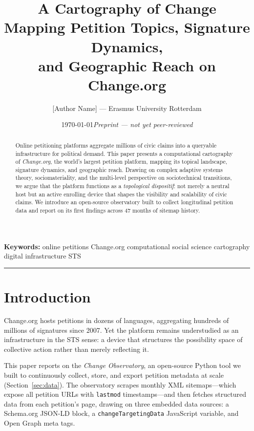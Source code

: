 \documentclass[a4paper, justified, notoc, nobib]{tufte-handout}
\title{A Cartography of Change\\[0.3em]
       \large Mapping Petition Topics, Signature Dynamics,\\
       and Geographic Reach on Change.org}
\author{[Author Name] --- Erasmus University Rotterdam}
\date{\today\quad\textit{Preprint --- not yet peer-reviewed}}
\begin{document}
\maketitle

\begin{abstract}
\noindent
Online petitioning platforms aggregate millions of civic claims into a
queryable infrastructure for political demand.
This paper presents a computational cartography of \emph{Change.org}, the
world's largest petition platform, mapping its topical landscape, signature
dynamics, and geographic reach.
Drawing on complex adaptive systems theory, sociomateriality, and the
multi-level perspective on sociotechnical transitions, we argue that the
platform functions as a \emph{topological dispositif}: not merely a neutral
host but an active enrolling device that shapes the visibility and scalability
of civic claims.
We introduce an open-source observatory built to collect longitudinal petition
data and report on its first findings across 47 months of sitemap history.
\end{abstract}

\smallskip
\noindent\textbf{Keywords:} online petitions \textbullet{} Change.org
\textbullet{} computational social science \textbullet{} cartography
\textbullet{} digital infrastructure \textbullet{} STS

\bigskip\hrule\bigskip

\section{Introduction}

Change.org hosts petitions in dozens of languages, aggregating hundreds of
millions of signatures since 2007.
Yet the platform remains understudied as an infrastructure in the STS sense: a
device that structures the possibility space of collective action rather than
merely reflecting it.

This paper reports on the \emph{Change Observatory}, an open-source Python
tool we built to continuously collect, store, and export petition metadata at
scale (Section~\ref{sec:data}).
The observatory scrapes monthly XML sitemaps---which expose all petition URLs
with \texttt{lastmod} timestamps---and then fetches structured data from each
petition's page, drawing on three embedded data sources: a Schema.org JSON-LD
block, a \texttt{changeTargetingData} JavaScript variable, and Open Graph meta
tags.
\end{document}
